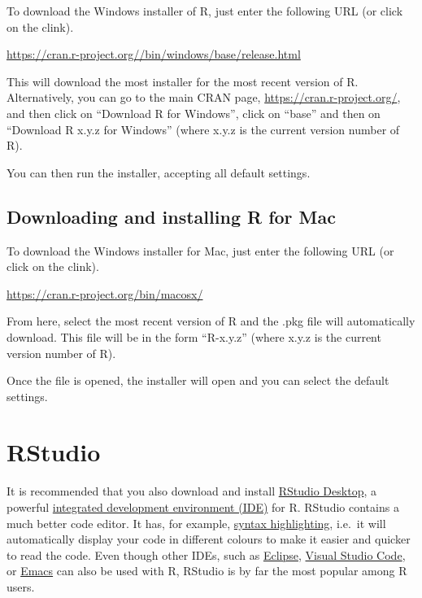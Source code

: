 \documentclass[
]{book}
\begin{document}
To download the Windows installer of R, just enter the following URL (or click on the clink).

\url{https://cran.r-project.org//bin/windows/base/release.html}

This will download the most installer for the most recent version of R. Alternatively, you can go to the main CRAN page, \url{https://cran.r-project.org/}, and then click on ``Download R for Windows'', click on ``base'' and then on ``Download R x.y.z for Windows'' (where x.y.z is the current version number of R).

You can then run the installer, accepting all default settings.

\hypertarget{downloading-and-installing-r-for-mac}{%
\subsection{Downloading and installing R for Mac}\label{downloading-and-installing-r-for-mac}}

To download the Windows installer for Mac, just enter the following URL (or click on the clink).

\url{https://cran.r-project.org/bin/macosx/}

From here, select the most recent version of R and the .pkg file will automatically download. This file will be in the form ``R-x.y.z'' (where x.y.z is the current version number of R).

Once the file is opened, the installer will open and you can select the default settings.

\hypertarget{rstudio}{%
\section{RStudio}\label{rstudio}}

It is recommended that you also download and install \href{https://www.rstudio.com/products/rstudio/download/}{RStudio Desktop}, a powerful \href{https://en.wikipedia.org/wiki/Integrated_development_environment}{integrated development environment (IDE)} for R. RStudio contains a much better code editor. It has, for example, \href{https://en.wikipedia.org/wiki/Syntax_highlighting}{syntax highlighting}, i.e.~it will automatically display your code in different colours to make it easier and quicker to read the code. Even though other IDEs, such as \href{http://www.walware.de/goto/statet}{Eclipse}, \href{https://code.visualstudio.com/}{Visual Studio Code}, or \href{https://ess.r-project.org/}{Emacs} can also be used with R, RStudio is by far the most popular among R users.
\end{document}
